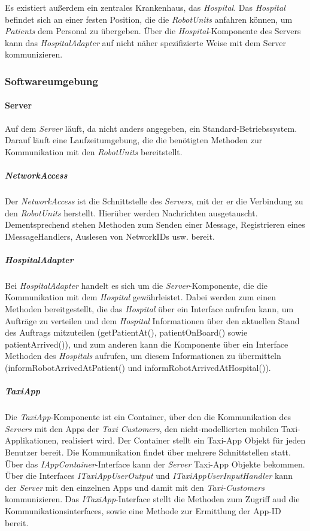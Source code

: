    Es existiert außerdem ein zentrales Krankenhaus, das \emph{Hospital}.
    Das \emph{Hospital} befindet sich an einer festen Position, die die \emph{RobotUnits} anfahren können, um \emph{Patients} dem Personal zu übergeben.
    Über die \emph{Hospital}-Komponente des Servers kann das \emph{HospitalAdapter} auf nicht näher spezifizierte Weise mit dem Server kommunizieren.

  \subsubsection{Softwareumgebung}

    \paragraph{Server}\label{server}
    		Auf dem \emph{Server} läuft, da nicht anders angegeben, ein Standard-Betriebssystem.
    		Darauf läuft eine Laufzeitumgebung, die die benötigten Methoden zur Kommunikation mit den \emph{RobotUnits} bereitstellt.
    	\subparagraph{NetworkAccess}\label{networkaccess}
    		Der \emph{NetworkAccess} ist die Schnittstelle des \emph{Servers}, mit der er die Verbindung zu den \emph{RobotUnits} herstellt.
        Hierüber werden Nachrichten ausgetauscht.
    		Dementsprechend stehen Methoden zum Senden einer Message, Registrieren eines IMessageHandlers, Auslesen von NetworkIDs usw. bereit.
    	\subparagraph{HospitalAdapter}\label{hospital}
    		Bei \emph{HospitalAdapter} handelt es sich um die \emph{Server}-Komponente, die die Kommunikation mit dem \emph{Hospital} gewährleistet.
    		Dabei werden zum einen Methoden bereitgestellt, die das \emph{Hospital} über ein Interface aufrufen kann, um Aufträge zu verteilen und dem \emph{Hospital} Informationen über den aktuellen Stand des Auftrags mitzuteilen (getPatientAt(), patientOnBoard() sowie patientArrived()), und zum anderen kann die Komponente über ein Interface Methoden des \emph{Hospitals} aufrufen, um diesem Informationen zu übermitteln (informRobotArrivedAtPatient() und informRobotArrivedAtHospital()).
      \subparagraph{TaxiApp}
        Die \emph{TaxiApp}-Komponente ist ein Container, über den die Kommunikation des \emph{Servers} mit den Apps der \emph{Taxi Customers}, den nicht-modellierten mobilen Taxi-Applikationen, realisiert wird.
        Der Container stellt ein Taxi-App Objekt für jeden Benutzer bereit.
        Die Kommunikation findet über mehrere Schnittstellen statt.
        Über das \emph{IAppContainer}-Interface kann der \emph{Server} Taxi-App Objekte bekommen.
        Über die Interfaces \emph{ITaxiAppUserOutput} und \emph{ITaxiAppUserInputHandler} kann der \emph{Server} mit den einzelnen Apps und damit mit den \emph{Taxi-Customers} kommunizieren.
        Das \emph{ITaxiApp}-Interface stellt die Methoden zum Zugriff aud die Kommunikationsinterfaces, sowie eine Methode zur Ermittlung der App-ID bereit.
